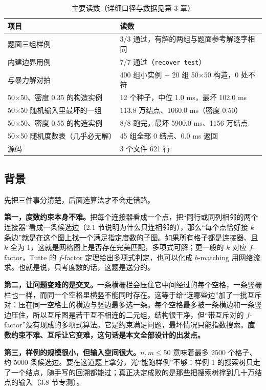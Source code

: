 \documentclass[12pt,a4paper,fontset=windows]{ctexart}
\newcommand{\code}[1]{\texttt{#1}}
\begin{document}
\begin{table}[htbp]
\centering
\caption{主要读数（详细口径与数据见第 3 章）}
\small
\begin{tabular}{ll}
\toprule
\rowcolor{gray!12}项目 & 读数 \\
\midrule
题面三组样例 & 3/3 通过，有解的两组与题面参考解逐字相同 \\
内建边界用例 & 7/7 通过（\code{recover test}） \\
与暴力解对拍 & 400 组小实例 + 20 组 50×50 构造，0 处不符 \\
50×50、密度 0.35 的构造实例 & 12 个种子，中位 1.0 ms，最坏 102.0 ms \\
50×50 随机输入里最坏的一组 & 113.8 万结点、1060.0 ms（密度 0.50） \\
50×50、密度 0.55 的构造实例 & 8/8 跑完，最坏 5900.0 ms、1156 万结点 \\
50×50 随机度数表（几乎必无解） & 45 组全部 0 结点、0.0 ms 返回 \\
源码 & 3 个文件 621 行 \\
\bottomrule
\end{tabular}
\end{table}

\subsection{背景}

先把三件事分清楚，后面选算法才不会走错路。

\textbf{第一，度数约束本身不难。}把每个连接器看成一个点，把“同行或同列相邻的两个连接器”看成一条候选边（2.1 节说明为什么只连相邻的），那么“每个点恰好接 $k$ 条边”就是在这个图上找一个满足指定度数的子图。如果所有格子都是连接器、且 $k$ 全为 1，这就是网格图上是否存在完美匹配，多项式可解；更一般的 $k$ 对应 $f$-factor，Tutte 的 $f$-factor 定理给出多项式判定，也可以化成 $b$-matching 用网络流求。也就是说，只考度数的话，这题是送分的。

\textbf{第二，让问题变难的是交叉。}一条横栅栏会压住它中间经过的每个空格，一条竖栅栏也一样，而同一个空格里横竖不能同时存在。这等于给“选哪些边”加了一批互斥对：压在同一空格上的横边与竖边最多选一条。每个空格最多被一条横边和一条竖边压住，所以互斥图是若干互不相连的二元组，结构很干净，但“带互斥对的 $f$-factor”没有现成的多项式算法。它是约束满足问题，最坏情况只能指数搜索。\textbf{度数约束不难、互斥让它变难，这句话是本文全部设计的出发点。}

\textbf{第三，样例的规模很小，但输入空间很大。}$n,m\le 50$ 意味着最多 2500 个格子、约 5000 条候选边。要在这道题上拿分，光“能跑样例”不够：样例 1 的搜索树只走了一个结点，随手写的回溯都能过；真正决定成败的是那些把搜索树撑到几十万结点的输入（3.8 节专测）。
\end{document}
